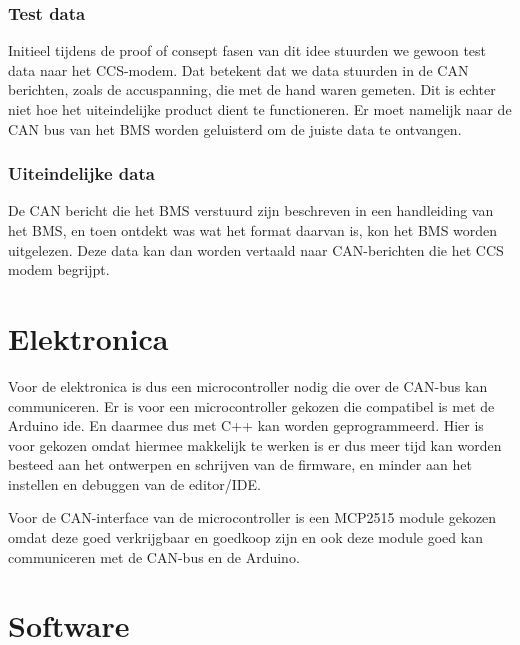 \subsubsection{Test data}

Initieel tijdens de proof of consept fasen van dit idee stuurden we gewoon test
data naar het CCS-modem. Dat betekent dat we data stuurden in de CAN berichten,
zoals de accuspanning, die met de hand waren gemeten. Dit is echter niet hoe
het uiteindelijke product dient te functioneren. Er moet namelijk naar de CAN
bus van het BMS worden geluisterd om de juiste data te ontvangen.

\subsubsection{Uiteindelijke data}

De CAN bericht die het BMS verstuurd zijn beschreven in een handleiding van het
BMS, en toen ontdekt was wat het format daarvan is, kon het BMS worden
uitgelezen. Deze data kan dan worden vertaald naar CAN-berichten die het CCS
modem begrijpt.

\section{Elektronica}

Voor de elektronica is dus een microcontroller nodig die over de CAN-bus kan
communiceren. Er is voor een microcontroller gekozen die compatibel is met de
Arduino \ac{ide}. En daarmee dus met C++ kan worden geprogrammeerd. Hier is
voor gekozen omdat hiermee makkelijk te werken is er dus meer tijd kan worden
besteed aan het ontwerpen en schrijven van de firmware, en minder aan het
instellen en debuggen van de editor/IDE.

Voor de CAN-interface van de microcontroller is een MCP2515 module gekozen
omdat deze goed verkrijgbaar en goedkoop zijn en ook deze module goed kan
communiceren met de CAN-bus en de Arduino. \cite{canbord}

\section{Software}

